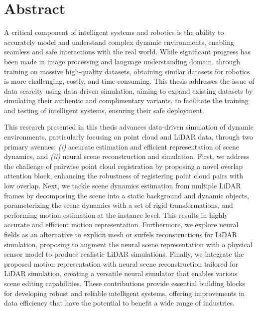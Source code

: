 
\chapter{Abstract}
\label{chap:abstract}
A critical component of intelligent systems and robotics is the ability to accurately model and understand complex dynamic environments, enabling seamless and safe interactions with the real world. While significant progress has been made in image processing and language understanding domain, through training on massive high-quality datasets, obtaining similar datasets for robotics is more challenging, costly, and time-consuming. This thesis addresses the issue of data scarcity using data-driven simulation, aiming to expand existing datasets by simulating their authentic and complimentary variants, to facilitate the training and testing of intelligent systems, ensuring their safe deployment.

This research presented in this thesis advances data-driven simulation of dynamic environments, particularly focusing on point cloud and LiDAR data, through two primary avenues: \textit{(i)} accurate estimation and efficient representation of scene dynamics, and \textit{(ii)} neural scene reconstruction and simulation. First, we address the challenge of pairwise point cloud registration by proposing a novel overlap attention block, enhancing the robustness of registering point cloud pairs with low overlap. Next, we tackle scene dynamics estimation from multiple LiDAR frames by decomposing the scene into a static background and dynamic objects, parameterizing the scene dynamics with a set of rigid transformations, and performing motion estimation at the instance level. This results in highly accurate and efficient motion representation. Furthermore, we explore neural fields as an alternative to explicit mesh or surfels reconstructions for LiDAR simulation, proposing to augment the neural scene representation with a physical sensor model to produce realistic LiDAR simulations. Finally, we integrate the proposed motion representation with neural scene reconstruction tailored for LiDAR simulation, creating a versatile neural simulator that enables various scene editing capabilities. These contributions provide essential building blocks for developing robust and reliable intelligent systems, offering improvements in data efficiency that have the potential to benefit a wide range of industries.


